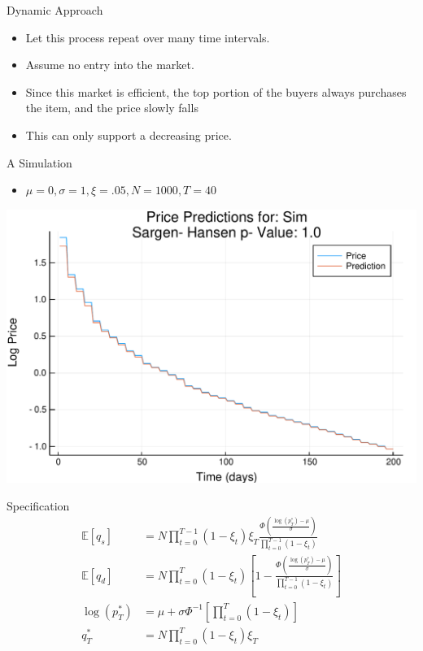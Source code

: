 \documentclass[bigger]{beamer}
\begin{document}
\begin{frame}[label=sec-1-11]{Dynamic Approach}
\begin{itemize}
\item Let this process repeat over many time intervals.
\item Assume no entry into the market.
\item Since this market is efficient, the top portion of the buyers always
purchases the item, and the price slowly falls
\item This can only support a decreasing price.
\end{itemize}
\end{frame}

\begin{frame}[label=sec-1-12]{A Simulation}
\begin{itemize}
\item $\mu = 0, \sigma = 1, \xi = .05, N = 1000, T = 40$
\end{itemize}
\includegraphics[width=.9\linewidth]{../Plots/Sim.pdf}
\end{frame}

\begin{frame}[label=sec-1-13]{Specification}
\begin{align*}
\mathbb{E}[ q_s ] &= N \prod_{t=0}^{T-1} (1-\xi_t ) \xi_T \frac{\Phi \left ( \frac{ \log ( p_T^* ) - \mu }{\sigma} \right )}{ \prod_{t=0}^{T-1} ( 1 - \xi_t ) }\\
\mathbb{E}[ q_d ] &= N \prod_{t=0}^{T} ( 1- \xi_t ) \left [ 1 - \frac{ \Phi \left ( \frac{
\log ( p_T^* ) - \mu }{ \sigma } \right ) }{ \prod_{t=0}^{T-1} (1 - \xi_t ) } \right ]\\
\log ( p_T^* ) &= \mu + \sigma \Phi^{-1} \left [ \prod_{t=0}^T ( 1 - \xi_t ) \right ]\\
q_T^* &= N \prod_{t=0}^T ( 1 - \xi_t ) \xi_T \\
\end{align*}
\end{frame}
\end{document}
